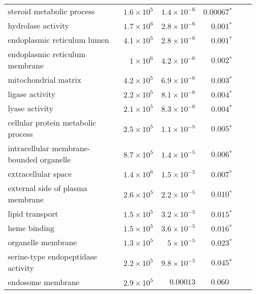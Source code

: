 \begin{longtable*}{|l|r|r|r|r|r|}
    steroid metabolic process                 & $1.6\times 10^{5}$ & $1.4\times 10^{-6}$  & $\bm{0.00067{^*}}$              \\
    hydrolase activity                        & $1.7\times 10^{6}$ & $2.8\times 10^{-6}$  & $\bm{ 0.001{^*}}$               \\
    endoplasmic reticulum lumen               & $4.1\times 10^{5}$ & $2.8\times 10^{-6}$  & $\bm{ 0.001{^*}}$               \\
    endoplasmic reticulum membrane            & $ 1\times 10^{6}$  & $4.2\times 10^{-6}$  & $\bm{ 0.002{^*}}$               \\
    mitochondrial matrix                      & $4.2\times 10^{5}$ & $6.9\times 10^{-6}$  & $\bm{ 0.003{^*}}$               \\
    ligase activity                           & $2.2\times 10^{5}$ & $8.1\times 10^{-6}$  & $\bm{ 0.004{^*}}$               \\
    lyase activity                            & $2.1\times 10^{5}$ & $8.3\times 10^{-6}$  & $\bm{ 0.004{^*}}$               \\
    cellular protein metabolic process        & $2.5\times 10^{5}$ & $1.1\times 10^{-5}$  & $\bm{ 0.005{^*}}$               \\
    intracellular membrane-bounded organelle  & $8.7\times 10^{5}$ & $1.4\times 10^{-5}$  & $\bm{ 0.006{^*}}$               \\
    extracellular space                       & $1.4\times 10^{6}$ & $1.5\times 10^{-5}$  & $\bm{ 0.007{^*}}$               \\
    external side of plasma membrane          & $2.6\times 10^{5}$ & $2.2\times 10^{-5}$  & $\bm{ 0.010{^*}}$               \\
    lipid transport                           & $1.5\times 10^{5}$ & $3.2\times 10^{-5}$  & $\bm{ 0.015{^*}}$               \\
    heme binding                              & $1.5\times 10^{5}$ & $3.6\times 10^{-5}$  & $\bm{ 0.016{^*}}$               \\
    organelle membrane                        & $1.3\times 10^{5}$ & $ 5\times 10^{-5}$   & $\bm{ 0.023{^*}}$               \\
    serine-type endopeptidase activity        & $2.2\times 10^{5}$ & $9.8\times 10^{-5}$  & $\bm{ 0.045{^*}}$               \\
    endosome membrane                         & $2.9\times 10^{5}$ & $0.00013$            & $ 0.060~~$                      \\

\end{longtable*}
